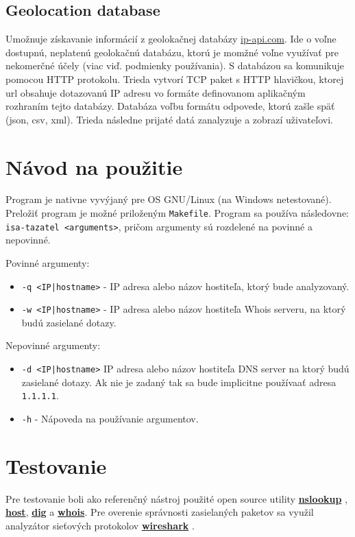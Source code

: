 \documentclass[a4paper, 11pt]{article}
\begin{document}
\subsection{Geolocation database} Umožnuje získavanie informácií z geolokačnej databázy \href{ip-api}{ip-api.com}. Ide o voľne dostupnú, neplatenú geolokačnú databázu, ktorú je momžné voľne využívať pre nekomerčné účely (viac viď. podmienky používania\cite{ip_api_terms}). S databázou sa komunikuje pomocou HTTP protokolu. Trieda vytvorí TCP paket s HTTP hlavičkou, ktorej url obsahuje dotazovanú IP adresu vo formáte definovanom aplikačným rozhraním tejto databázy. Databáza voľbu formátu odpovede, ktorú zašle späť (json, csv, xml). Trieda následne prijaté datá zanalyzuje a zobrazí uživateľovi.

\section{Návod na použitie}
Program je nativne vyvýjaný pre OS GNU/Linux (na Windows netestované). Preložiť program je možné priloženým \texttt{Makefile}. Program sa používa následovne: \texttt{isa-tazatel <arguments>}, pričom argumenty sú rozdelené na povinné a nepovinné.

Povinné argumenty:
\begin{itemize}
	\item\texttt{-q <IP|hostname>} - IP adresa alebo názov hostiteľa, ktorý bude analyzovaný.
	\item \texttt{-w <IP|hostname>} - IP adresa alebo názov hostiteľa Whois serveru, na ktorý budú zasielané dotazy.
\end{itemize}

Nepovinné argumenty:
\begin{itemize}
	\item \texttt{-d <IP|hostname>} IP adresa alebo názov hostiteľa DNS server na ktorý budú zasielané dotazy. Ak nie je zadaný tak sa bude implicitne používaať adresa \texttt{1.1.1.1}.
	\item \texttt{-h} - Nápoveda na používanie argumentov.
\end{itemize}


\section{Testovanie}

Pre testovanie boli ako referenčný nástroj použité open source utility \href{https://linux.die.net/man/1/nslookup}{\textbf{nslookup}} , \href{https://linux.die.net/man/1/host}{\textbf{host}}, \href{https://linux.die.net/man/1/dig}{\textbf{dig}} a \href{https://linux.die.net/man/1/whois}{\textbf{whois}}. Pre overenie správnosti zasielaných paketov sa využil analyzátor sieťových protokolov \href{https://www.wireshark.org/}{\textbf{wireshark}} .
\end{document}
